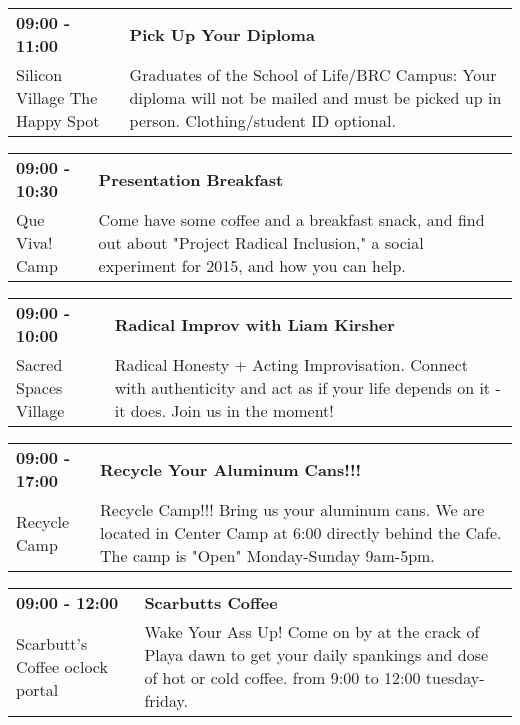 \begin{tabular}{ p{1in} p{2.2in} }
    \textbf{09:00 - 11:00} & \textbf{Pick Up Your Diploma} \\
    Silicon Village \newline The Happy Spot & Graduates of the School of Life/BRC Campus: Your diploma will not be mailed and must be picked up in person. Clothing/student ID optional. \\
    \hline 
\end{tabular}
    
\begin{tabular}{ p{1in} p{2.2in} }
    \textbf{09:00 - 10:30} & \textbf{Presentation Breakfast} \\
    Que Viva! Camp \newline  & Come have some coffee and a breakfast snack, and find out about "Project Radical Inclusion," a social experiment for 2015, and how you can help. \\
    \hline 
\end{tabular}
    
\begin{tabular}{ p{1in} p{2.2in} }
    \textbf{09:00 - 10:00} & \textbf{Radical Improv with Liam Kirsher} \\
    Sacred Spaces Village \newline  & Radical Honesty + Acting Improvisation. Connect with authenticity and act as if your life depends on it - it does. Join us in the moment! \\
    \hline 
\end{tabular}
    
\begin{tabular}{ p{1in} p{2.2in} }
    \textbf{09:00 - 17:00} & \textbf{Recycle Your Aluminum Cans!!!} \\
    Recycle Camp \newline  & Recycle Camp!!! Bring us your aluminum cans. We are located in Center Camp at 6:00 directly behind the Cafe. The camp is "Open" Monday-Sunday 9am-5pm. \\
    \hline 
\end{tabular}
    
\begin{tabular}{ p{1in} p{2.2in} }
    \textbf{09:00 - 12:00} & \textbf{Scarbutts Coffee} \\
    Scarbutt's Coffee \newline 9 oclock portal & Wake Your Ass Up! Come on by at the crack of Playa dawn to get your daily spankings and dose of hot or cold coffee. from 9:00 to 12:00 tuesday-friday. \\
    \hline 
\end{tabular}
    

